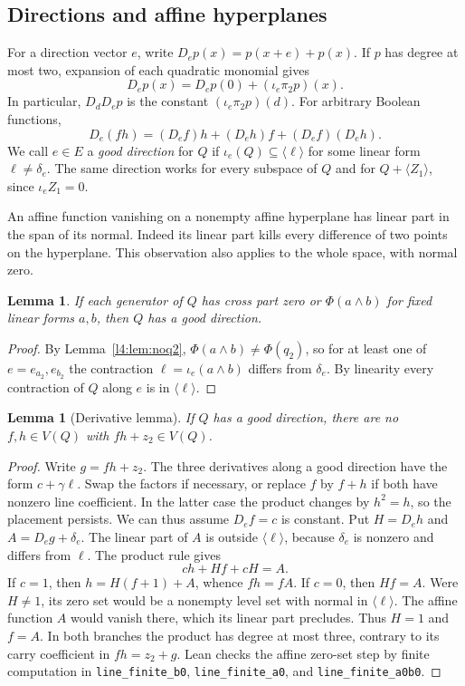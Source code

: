 \documentclass[11pt,a4paper]{article}
\theoremstyle{plain}
\newtheorem{lemma}[theorem]{Lemma}
\theoremstyle{remark}
\theoremstyle{plain}
\begin{document}
\subsection{Directions and affine hyperplanes}

For a direction vector $e$, write $D_e p(x)=p(x+e)+p(x)$. If $p$ has degree at most two, expansion of each quadratic monomial gives
\[
D_e p(x)=D_e p(0)+(\iota_e\pi_2p)(x).
\]
In particular, $D_dD_e p$ is the constant $(\iota_e\pi_2p)(d)$.
For arbitrary Boolean functions,
\[
D_e(fh)=(D_ef)h+(D_eh)f+(D_ef)(D_eh).
\]
We call $e\in E$ a \emph{good direction} for $Q$ if
$\iota_e(Q)\subseteq\langle\ell\rangle$ for some linear form
$\ell\ne\delta_e$. The same direction works for every subspace of $Q$ and for $Q+\langle Z_1\rangle$, since $\iota_e Z_1=0$.

An affine function vanishing on a nonempty affine hyperplane has linear part in the span of its normal. Indeed its linear part kills every difference of two points on the hyperplane. This observation also applies to the whole space, with normal zero.

\begin{lemma}\label{toolkit:common}
If each generator of $Q$ has cross part zero or $\Phi(a\wedge b)$ for fixed linear forms $a,b$, then $Q$ has a good direction.
\end{lemma}
\begin{proof}
By Lemma~\ref{l4:lem:noq2}, $\Phi(a\wedge b)\ne\Phi(q_2)$, so for at least one of $e=e_{a_2},e_{b_2}$ the contraction $\ell=\iota_e(a\wedge b)$ differs from $\delta_e$. By linearity every contraction of $Q$ along $e$ is in $\langle\ell\rangle$.
\end{proof}

\begin{lemma}[Derivative lemma]\label{l4:lem:deriv}
If $Q$ has a good direction, there are no $f,h\in V(Q)$ with $fh+z_2\in V(Q)$.
\end{lemma}
\begin{proof}
Write $g=fh+z_2$. The three derivatives along a good direction have the form $c+\gamma\ell$. Swap the factors if necessary, or replace $f$ by $f+h$ if both have nonzero line coefficient. In the latter case the product changes by $h^2=h$, so the placement persists. We can thus assume $D_e f=c$ is constant. Put $H=D_e h$ and $A=D_e g+\delta_e$. The linear part of $A$ is outside $\langle\ell\rangle$, because $\delta_e$ is nonzero and differs from $\ell$. The product rule gives
\[
ch+Hf+cH=A.
\]
If $c=1$, then $h=H(f+1)+A$, whence $fh=fA$. If $c=0$, then $Hf=A$. Were $H\ne1$, its zero set would be a nonempty level set with normal in $\langle\ell\rangle$. The affine function $A$ would vanish there, which its linear part precludes. Thus $H=1$ and $f=A$. In both branches the product has degree at most three, contrary to its carry coefficient in $fh=z_2+g$. Lean checks the affine zero-set step by finite computation in \nolinkurl{line_finite_b0}, \nolinkurl{line_finite_a0}, and \nolinkurl{line_finite_a0b0}.
\end{proof}
\end{document}
